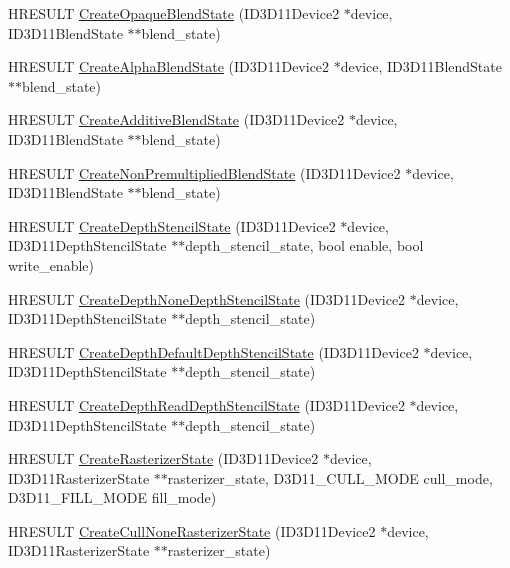 \begin{DoxyCompactItemize}
\item 
H\+R\+E\+S\+U\+LT \hyperlink{namespacemage_ab2f30a0ab5f75edd279091ee24bc7811}{Create\+Opaque\+Blend\+State} (I\+D3\+D11\+Device2 $\ast$device, I\+D3\+D11\+Blend\+State $\ast$$\ast$blend\+\_\+state)
\item 
H\+R\+E\+S\+U\+LT \hyperlink{namespacemage_a334c4403848e086f84b328883ff387cc}{Create\+Alpha\+Blend\+State} (I\+D3\+D11\+Device2 $\ast$device, I\+D3\+D11\+Blend\+State $\ast$$\ast$blend\+\_\+state)
\item 
H\+R\+E\+S\+U\+LT \hyperlink{namespacemage_a5c813464cd190784dec2d505d3254917}{Create\+Additive\+Blend\+State} (I\+D3\+D11\+Device2 $\ast$device, I\+D3\+D11\+Blend\+State $\ast$$\ast$blend\+\_\+state)
\item 
H\+R\+E\+S\+U\+LT \hyperlink{namespacemage_a6f4e37e4b8092acec9dad9a8b24ebb07}{Create\+Non\+Premultiplied\+Blend\+State} (I\+D3\+D11\+Device2 $\ast$device, I\+D3\+D11\+Blend\+State $\ast$$\ast$blend\+\_\+state)
\item 
H\+R\+E\+S\+U\+LT \hyperlink{namespacemage_a8821b7d9587082504cb1f4d04e53ff05}{Create\+Depth\+Stencil\+State} (I\+D3\+D11\+Device2 $\ast$device, I\+D3\+D11\+Depth\+Stencil\+State $\ast$$\ast$depth\+\_\+stencil\+\_\+state, bool enable, bool write\+\_\+enable)
\item 
H\+R\+E\+S\+U\+LT \hyperlink{namespacemage_ab1edddad5787ae095bc03f1cf5c54564}{Create\+Depth\+None\+Depth\+Stencil\+State} (I\+D3\+D11\+Device2 $\ast$device, I\+D3\+D11\+Depth\+Stencil\+State $\ast$$\ast$depth\+\_\+stencil\+\_\+state)
\item 
H\+R\+E\+S\+U\+LT \hyperlink{namespacemage_adc620b251acd7cb9c4b5f905607ceee5}{Create\+Depth\+Default\+Depth\+Stencil\+State} (I\+D3\+D11\+Device2 $\ast$device, I\+D3\+D11\+Depth\+Stencil\+State $\ast$$\ast$depth\+\_\+stencil\+\_\+state)
\item 
H\+R\+E\+S\+U\+LT \hyperlink{namespacemage_a56b331ac7866106016040e4ebce50790}{Create\+Depth\+Read\+Depth\+Stencil\+State} (I\+D3\+D11\+Device2 $\ast$device, I\+D3\+D11\+Depth\+Stencil\+State $\ast$$\ast$depth\+\_\+stencil\+\_\+state)
\item 
H\+R\+E\+S\+U\+LT \hyperlink{namespacemage_a801f8c5a484129ae6717733de626b625}{Create\+Rasterizer\+State} (I\+D3\+D11\+Device2 $\ast$device, I\+D3\+D11\+Rasterizer\+State $\ast$$\ast$rasterizer\+\_\+state, D3\+D11\+\_\+\+C\+U\+L\+L\+\_\+\+M\+O\+DE cull\+\_\+mode, D3\+D11\+\_\+\+F\+I\+L\+L\+\_\+\+M\+O\+DE fill\+\_\+mode)
\item 
H\+R\+E\+S\+U\+LT \hyperlink{namespacemage_a7583853c115c9c5cecb583fa61157c25}{Create\+Cull\+None\+Rasterizer\+State} (I\+D3\+D11\+Device2 $\ast$device, I\+D3\+D11\+Rasterizer\+State $\ast$$\ast$rasterizer\+\_\+state)

\end{DoxyCompactItemize}
